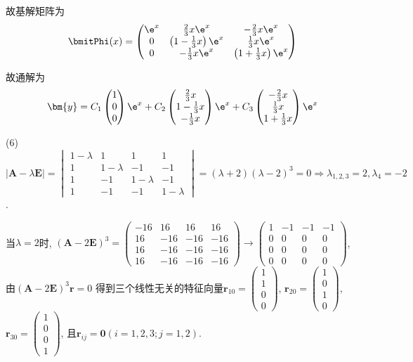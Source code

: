 \begin{solve}
故基解矩阵为
\[\bmitPhi(x)=\begin{pmatrix}\e^x&\frac{2}{3}x\e^x&-\frac{2}{3}x\e^x\\
0&\left(1-\frac{1}{3}x\right)\e^x&\frac{1}{3}x\e^x\\
0&-\frac{1}{3}x\e^x&\left(1+\frac{1}{3}x\right)\e^x\end{pmatrix}\]

故通解为
\[\bm{y}=C_1\begin{pmatrix}1\\0\\0\end{pmatrix}\e^x+C_2\begin{pmatrix}\frac{2}{3}x\\1-\frac{1}{3}x\\-\frac{1}{3}x\end{pmatrix}\e^x+C_3\begin{pmatrix}-\frac{2}{3}x\\\frac{1}{3}x\\1+\frac{1}{3}x\end{pmatrix}\e^x\]

(6)$|\bm{A}-\lambda\bm{E}|=\begin{vmatrix}1-\lambda&1&1&1\\1&1-\lambda&-1&-1\\1&-1&1-\lambda&-1\\1&-1&-1&1-\lambda\end{vmatrix}=(\lambda+2)(\lambda-2)^3=0\Rightarrow\lambda_{1,2,3}=2,\lambda_4=-2$.

当$\lambda=2$时, $(\bm{A}-2\bm{E})^3=\begin{pmatrix}-16&16&16&16\\16&-16&-16&-16\\16&-16&-16&-16\\16&-16&-16&-16\end{pmatrix}\to\begin{pmatrix}1&-1&-1&-1\\0&0&0&0\\0&0&0&0\\0&0&0&0\end{pmatrix}$, 由$(\bm{A}-2\bm{E})^3\bm{r}=0$
得到三个线性无关的特征向量$\bm{r}_{10}=\begin{pmatrix}1\\1\\0\\0\end{pmatrix}$,
$\bm{r}_{20}=\begin{pmatrix}1\\0\\1\\0\end{pmatrix}$,
$\bm{r}_{30}=\begin{pmatrix}1\\0\\0\\1\end{pmatrix}$, 	
且$\bm{r}_{ij}=\bm{0}(i=1,2,3;j=1,2)$.


\end{solve}
